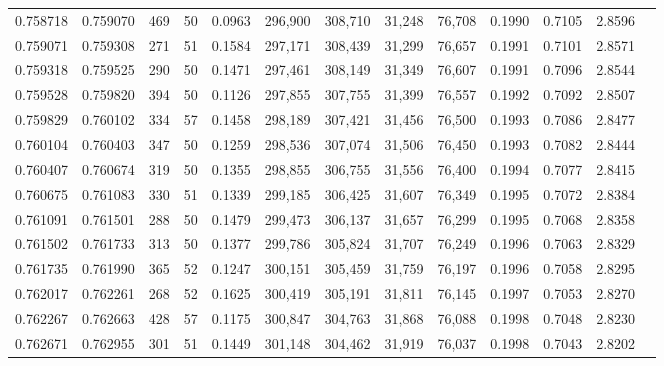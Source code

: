 \begin{tabular}{rrrrrrrrrrrrr}
0.758718 & 0.759070 &   469 &  50 &                                     0.0963 & 296,900 & 308,710 &  31,248 &  76,708 & 0.1990 & 0.7105 & 2.8596 \\
0.759071 & 0.759308 &   271 &  51 &                                     0.1584 & 297,171 & 308,439 &  31,299 &  76,657 & 0.1991 & 0.7101 & 2.8571 \\
0.759318 & 0.759525 &   290 &  50 &                                     0.1471 & 297,461 & 308,149 &  31,349 &  76,607 & 0.1991 & 0.7096 & 2.8544 \\
0.759528 & 0.759820 &   394 &  50 &                                     0.1126 & 297,855 & 307,755 &  31,399 &  76,557 & 0.1992 & 0.7092 & 2.8507 \\
0.759829 & 0.760102 &   334 &  57 &                                     0.1458 & 298,189 & 307,421 &  31,456 &  76,500 & 0.1993 & 0.7086 & 2.8477 \\
0.760104 & 0.760403 &   347 &  50 &                                     0.1259 & 298,536 & 307,074 &  31,506 &  76,450 & 0.1993 & 0.7082 & 2.8444 \\
0.760407 & 0.760674 &   319 &  50 &                                     0.1355 & 298,855 & 306,755 &  31,556 &  76,400 & 0.1994 & 0.7077 & 2.8415 \\
0.760675 & 0.761083 &   330 &  51 &                                     0.1339 & 299,185 & 306,425 &  31,607 &  76,349 & 0.1995 & 0.7072 & 2.8384 \\
0.761091 & 0.761501 &   288 &  50 &                                     0.1479 & 299,473 & 306,137 &  31,657 &  76,299 & 0.1995 & 0.7068 & 2.8358 \\
0.761502 & 0.761733 &   313 &  50 &                                     0.1377 & 299,786 & 305,824 &  31,707 &  76,249 & 0.1996 & 0.7063 & 2.8329 \\
0.761735 & 0.761990 &   365 &  52 &                                     0.1247 & 300,151 & 305,459 &  31,759 &  76,197 & 0.1996 & 0.7058 & 2.8295 \\
0.762017 & 0.762261 &   268 &  52 &                                     0.1625 & 300,419 & 305,191 &  31,811 &  76,145 & 0.1997 & 0.7053 & 2.8270 \\
0.762267 & 0.762663 &   428 &  57 &                                     0.1175 & 300,847 & 304,763 &  31,868 &  76,088 & 0.1998 & 0.7048 & 2.8230 \\
0.762671 & 0.762955 &   301 &  51 &                                     0.1449 & 301,148 & 304,462 &  31,919 &  76,037 & 0.1998 & 0.7043 & 2.8202 \\

\end{tabular}
